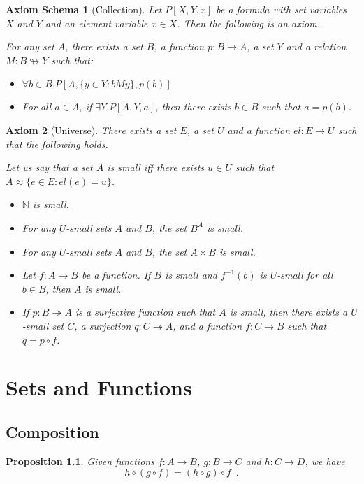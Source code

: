\documentclass{book}
\newtheorem{ax}{Axiom}[section]
\newtheorem{axs}[ax]{Axiom Schema}
\newtheorem{prop}[ax]{Proposition}
\theoremstyle{definition}
\begin{document}
\begin{axs}[Collection]
Let $P[X,Y,x]$ be a formula with set variables $X$ and $Y$ and an element variable $x \in X$. Then the following is an axiom.

For any set $A$, there exists a set $B$, a function $p : B \rightarrow A$, a set $Y$ and a relation $M : B \looparrowright Y$ such that:
\begin{itemize}
\item $\forall b \in B. P[A, \{ y \in Y : bMy \}, p(b)]$
\item For all $a \in A$, if $\exists Y. P[A,Y,a]$, then there exists $b \in B$ such that $a = p(b)$.
\end{itemize}
\end{axs}

\begin{ax}[Universe]
There exists a set $E$, a set $U$ and a function $el : E \rightarrow U$ such that the following holds.

Let us say that a set $A$ is \emph{small} iff there exists $u \in U$ such that $A \approx \{ e \in E : el(e) = u \}$.

\begin{itemize}
\item $\mathbb{N}$ is small.
\item For any $U$-small sets $A$ and $B$, the set $B^A$ is small.
\item For any $U$-small sets $A$ and $B$, the set $A \times B$ is small.
\item Let $f : A \rightarrow B$ be a function. If $B$ is small and $f^{-1}(b)$ is $U$-small for all $b \in B$, then $A$ is small.
\item If $p : B \twoheadrightarrow A$ is a surjective function such that $A$ is small, then there exists a $U$-small set $C$, a surjection $q : C \twoheadrightarrow A$, and a function $f : C \rightarrow B$ such that $q = p \circ f$.
\end{itemize}
\end{ax}

\chapter{Sets and Functions}

\section{Composition}

\begin{prop}
Given functions $f : A \rightarrow B$, $g : B \rightarrow C$ and $h : C \rightarrow D$, we have
\[ h \circ (g \circ f) = (h \circ g) \circ f \enspace . \]
\end{prop}
\end{document}
